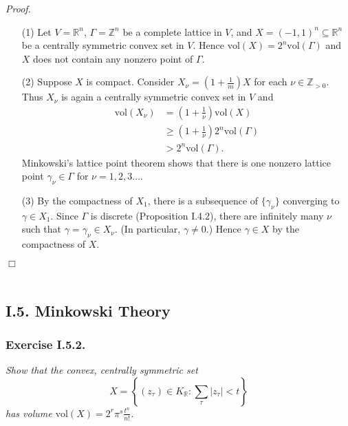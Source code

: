 \documentclass{article}
\begin{document}
\emph{Proof.}
\begin{enumerate}
\item[(1)]
  Let $V = \mathbb{R}^n$, $\Gamma = \mathbb{Z}^n$ be a complete lattice in $V$, and
  $X = (-1,1)^n \subseteq \mathbb{R}^n$ be a centrally symmetric convex set in $V$.
  Hence $\mathrm{vol}(X) = 2^n \mathrm{vol}(\Gamma)$
  and $X$ does not contain any nonzero point of $\Gamma$.

\item[(2)]
  Suppose $X$ is compact.
  Consider $X_\nu = (1+\frac{1}{m})X$ for each $\nu \in \mathbb{Z}_{> 0}$.
  Thus $X_\nu$ is again a centrally symmetric convex set in $V$
  and
  \begin{align*}
    \mathrm{vol}(X_\nu)
    &= \left( 1+\frac{1}{\nu} \right) \mathrm{vol}(X) \\
    &\geq \left( 1+\frac{1}{\nu} \right) 2^n \mathrm{vol}(\Gamma) \\
    &> 2^n \mathrm{vol}(\Gamma).
  \end{align*}
  Minkowski's lattice point theorem shows that
  there is one nonzero lattice point $\gamma_\nu \in \Gamma$ for $\nu = 1, 2, 3 \ldots$.

\item[(3)]
  By the compactness of $X_1$,
  there is a subsequence of $\{ \gamma_\nu \}$ converging to $\gamma \in X_1$.
  Since $\Gamma$ is discrete (Proposition I.4.2),
  there are infinitely many $\nu$ such that $\gamma = \gamma_\nu \in X_\nu$.
  (In particular, $\gamma \neq 0$.)
  Hence $\gamma \in X$ by the compactness of $X$.
\end{enumerate}
$\Box$ \\\\






\subsection*{I.5. Minkowski Theory \\}



\subsubsection*{Exercise I.5.2.}
\emph{Show that the convex, centrally symmetric set
\[
  X = \left\{ (z_\tau) \in K_{\mathbb{R}} : \sum_{\tau}|z_\tau| < t \right\}
\]
has volume $\mathrm{vol}(X) = 2^r \pi^s \frac{t^n}{n!}$.} \\
\end{document}
